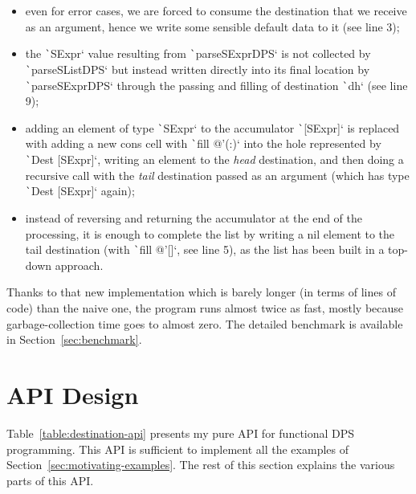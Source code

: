 \documentclass[english]{jflart}
\begin{document}
\begin{itemize}
  \item even for error cases, we are forced to consume the destination that we receive as an argument, hence we write some sensible default data to it (see line 3);
  \item the \texttt`SExpr` value resulting from \texttt`parseSExprDPS` is not collected by \texttt`parseSListDPS` but instead written directly into its final location by \texttt`parseSExprDPS` through the passing and filling of destination \texttt`dh` (see line 9);
  \item adding an element of type \texttt`SExpr` to the accumulator \texttt`[SExpr]` is replaced with adding a new cons cell with \texttt`fill @'(:)` into the hole represented by \texttt`Dest [SExpr]`, writing an element to the \emph{head} destination, and then doing a recursive call with the \emph{tail} destination passed as an argument (which has type \texttt`Dest [SExpr]` again);
  \item instead of reversing and returning the accumulator at the end of the processing, it is enough to complete the list by writing a nil element to the tail destination (with \texttt`fill @'[]`, see line 5), as the list has been built in a top-down approach.
\end{itemize}

Thanks to that new implementation which is barely longer (in terms of lines of code) than the naive one, the program runs almost twice as fast, mostly because garbage-collection time goes to almost zero. The detailed benchmark is available in Section~\ref{sec:benchmark}.

\section{API Design}\label{sec:api}

Table~\ref{table:destination-api} presents my pure API for functional DPS programming. This API is sufficient to implement all the examples of Section~\ref{sec:motivating-examples}. The rest of this section explains the various parts of this API.
\end{document}
